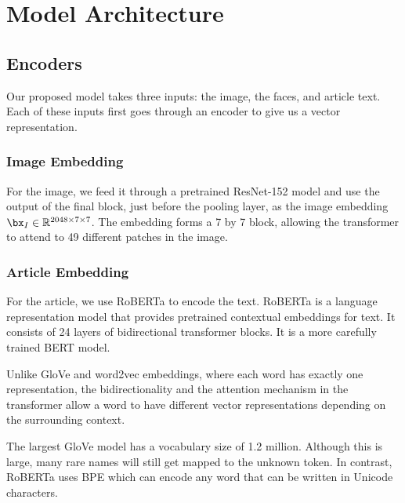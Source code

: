 
\section{Model Architecture}

\subsection{Encoders}

Our proposed model takes three inputs: the image, the faces, and article text.
Each of these inputs first goes through an encoder to give us a vector
representation.

\subsubsection{Image Embedding}

For the image, we feed it through a pretrained ResNet-152 model
\cite{He2016ResNet} and use the output of the final block, just before the
pooling layer, as the image embedding $\bx_I \in \mathbb{R}^{2048 \times 7
\times 7}$. The embedding forms a 7 by 7 block, allowing the transformer to
attend to 49 different patches in the image.

\subsubsection{Article Embedding}

For the article, we use RoBERTa \cite{Liu2019RoBERTaAR} to encode the text.
RoBERTa is a language representation model that provides pretrained contextual
embeddings for text. It consists of 24 layers of bidirectional transformer
blocks. It is a more carefully trained BERT \cite{Devlin2019BERT} model.

Unlike GloVe \cite{Pennington2014Glove} and word2vec
\cite{Mikolov2013DistributedRO} embeddings, where each word has exactly one
representation, the bidirectionality and the attention mechanism in the
transformer allow a word to have different vector representations depending on
the surrounding context.

The largest GloVe model has a vocabulary size of 1.2 million. Although this is
large, many rare names will still get mapped to the unknown token. In contrast,
RoBERTa uses BPE \cite{Sennrich2015NeuralMT,Radford2019LanguageMA} which can
encode any word that can be written in Unicode characters.


